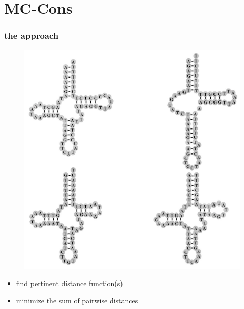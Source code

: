 \documentclass{beamer}
\begin{document}
\section{MC-Cons}


\begin{frame}
	\frametitle{the approach}

	\begin{figure}
		\centering
		\includegraphics[scale=0.5]{figs/consensus}
	\end{figure}
	
	\begin{itemize}
		\item find pertinent distance function(s)		
		\item minimize the sum of pairwise distances
	\end{itemize}
	\begin{figure}
	\centering
	
	\end{figure}
\end{frame}
\end{document}
